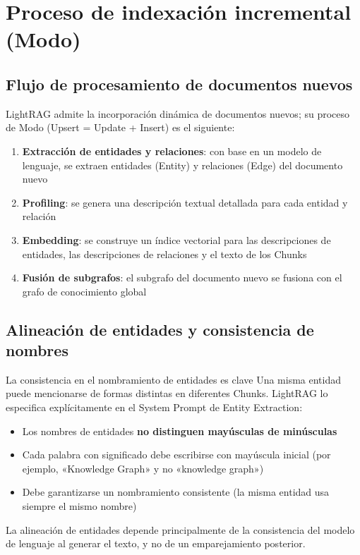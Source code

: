 \section{Proceso de indexación incremental (Modo)}

\subsection{Flujo de procesamiento de documentos nuevos}

LightRAG admite la incorporación dinámica de documentos nuevos; su proceso de Modo (Upsert = Update + Insert) es el siguiente:

\begin{enumerate}
    \item \textbf{Extracción de entidades y relaciones}: con base en un modelo de lenguaje, se extraen entidades (Entity) y relaciones (Edge) del documento nuevo
    \item \textbf{Profiling}: se genera una descripción textual detallada para cada entidad y relación
    \item \textbf{Embedding}: se construye un índice vectorial para las descripciones de entidades, las descripciones de relaciones y el texto de los Chunks
    \item \textbf{Fusión de subgrafos}: el subgrafo del documento nuevo se fusiona con el grafo de conocimiento global
\end{enumerate}

\subsection{Alineación de entidades y consistencia de nombres}

\begin{warningbox}{La consistencia en el nombramiento de entidades es clave}
Una misma entidad puede mencionarse de formas distintas en diferentes Chunks. LightRAG lo especifica explícitamente en el System Prompt de Entity Extraction:
\begin{itemize}
    \item Los nombres de entidades \textbf{no distinguen mayúsculas de minúsculas}
    \item Cada palabra con significado debe escribirse con mayúscula inicial (por ejemplo, «Knowledge Graph» y no «knowledge graph»)
    \item Debe garantizarse un nombramiento consistente (la misma entidad usa siempre el mismo nombre)
\end{itemize}
La alineación de entidades depende principalmente de la consistencia del modelo de lenguaje al generar el texto, y no de un emparejamiento posterior.
\end{warningbox}

